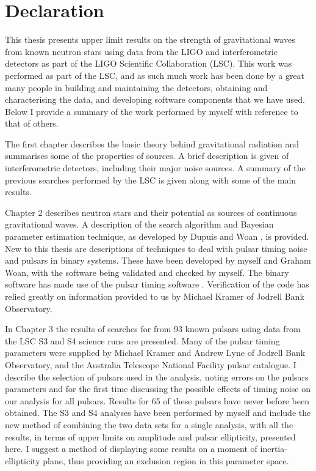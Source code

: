 

\newpage
\chapter*{Declaration}
This thesis presents upper limit results on the strength of gravitational waves from known neutron
stars using data from the LIGO and \geo interferometric \gw detectors as part of the LIGO Scientific
Collaboration (LSC). This work was performed as part of the LSC, and as such much work has been done
by a great many people in building and maintaining the detectors, obtaining and characterising the
data, and developing software components that we have used. Below I provide a summary of the work
performed by myself with reference to that of others.

The first chapter describes the basic theory behind gravitational radiation and summarises some of
the properties of \gw sources. A brief description is given of interferometric \gw detectors,
including their major noise sources. A summary of the previous searches performed by the LSC is
given along with some of the main results.

Chapter 2 describes neutron stars and their potential as sources of continuous gravitational
waves. A description of the search algorithm and Bayesian parameter estimation technique, as
developed by Dupuis and Woan \cite{DupuisWoan:2005}, is provided. New to this thesis are
descriptions of techniques to deal with pulsar timing noise and pulsars in binary systems. These
have been developed by myself and Graham Woan, with the software being validated and checked by
myself. The binary software has made use of the pulsar timing software \tempo \cite{TEMPO}.
Verification of the code has relied greatly on information provided to us by Michael Kramer of
Jodrell Bank Observatory.

In Chapter 3 the results of searches for \gws from 93 known pulsars using data from the LSC S3
and S4 science runs are presented. Many of the pulsar timing parameters were supplied by Michael
Kramer and Andrew Lyne of Jodrell Bank Observatory, and the Australia Telescope National Facility
pulsar catalogue. I describe the selection of pulsars used in the analysis, noting errors on the
pulsars parameters and for the first time discussing the possible effects of timing noise on our
analysis for all pulsars. Results for 65 of these pulsars have never before been obtained. The S3
and S4 analyses have been performed by myself and include the new method of combining the two data
sets for a single analysis, with all the results, in terms of upper limits on \gw amplitude and
pulsar ellipticity, presented here. I suggest a method of displaying some results on a moment of
inertia-ellipticity plane, thus providing an exclusion region in this parameter space. 

